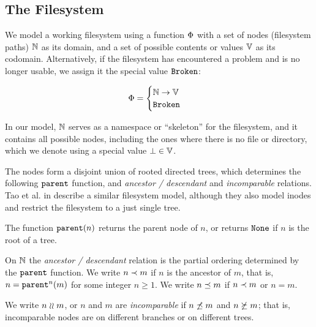 
\subsection{The Filesystem}

We model a working filesystem
using a function $\Phi$ with a set of nodes (filesystem paths) $\mathbb{N}$ as its domain,
and a set of possible contents or values $\mathbb{V}$ as its codomain.
Alternatively, if the filesystem has encountered a problem and is no longer usable, 
we assign it the special value $\mathtt{Broken}$:
\begin{mydef}[Filesystem]
\begin{gather*}
\Phi =
\begin{cases}
\mathbb{N} \rightarrow \mathbb{V} \\
\mathtt{Broken}
\end{cases}
\end{gather*}
\end{mydef}
In our model, $\mathbb{N}$ 
serves as a namespace or ``skeleton'' for the filesystem, and it
contains all possible nodes, including the ones where there is no file or directory,
which we denote using a special value $\bot\in\mathbb{V}$.

The nodes form a disjoint union of rooted directed trees,
which determines the following $\parent$ function,
and \emph{ancestor / descendant} and \emph{incomparable} relations.
Tao et al. in \cite{TSR} describe a similar filesystem model, although
they also model inodes and restrict the filesystem to a just single tree.
\begin{mydef}[$\parent$]
The function $\mathtt{parent}(n)$ returns the parent node of $n$, or
returns $\mathtt{None}$ if $n$ is the root of a tree.
\end{mydef}

\begin{mydef}[$n\descendant m$]
On $\mathbb{N}$ the \emph{ancestor / descendant} relation is the
partial ordering determined by the $\parent$ function.
We write $n\descendant m$ if $n$ is the ancestor of $m$,
that is, $n=\mathtt{parent}^n(m)$ for some integer $n\ge 1$.
We write $n\preceq m$ if $n\descendant m$ or $n=m$.
\end{mydef}

\begin{mydef}[$n\unrel m$]
We write $n\unrel m$, or $n$ and $m$ are \emph{incomparable}
if $n\not\preceq m$ and $n\not\succeq m$;
that is, incomparable nodes are on different branches or on different trees.
\end{mydef}

